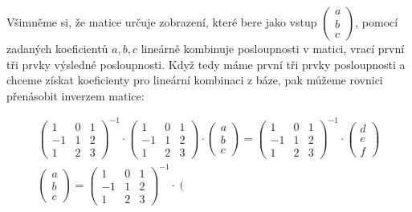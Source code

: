 \documentclass[12pt]{article}
\begin{document}
\begin{enumerate}
\begin{enumerate}
      Všimněme si, že matice určuje zobrazení, které bere jako vstup $\left(\begin{array}{c}
          a \\ b \\ c
        \end{array}\right)$, pomocí zadaných koeficientů $a,b,c$ lineárně kombinuje posloupnosti v matici,
      vrací první tři prvky výsledné posloupnosti. Když tedy máme první tři prvky posloupnosti
      a chceme získat koeficienty pro lineární kombinaci z báze, pak můžeme rovnici přenásobit
      inverzem matice:
      
      \begin{align*}
        \left(\begin{array}{ccc}
          1 & 0 & 1 \\
          -1 & 1 & 2 \\
          1 & 2 & 3
        \end{array}\right)^{-1} \cdot \left(\begin{array}{ccc}
          1 & 0 & 1 \\
          -1 & 1 & 2 \\
          1 & 2 & 3
        \end{array}\right) \cdot \left(\begin{array}{c}
          a \\ b \\ c
        \end{array}\right) = \left(\begin{array}{ccc}
          1 & 0 & 1 \\
          -1 & 1 & 2 \\
          1 & 2 & 3
        \end{array}\right)^{-1} \cdot \left(\begin{array}{c}
          d \\ e \\ f
        \end{array}\right) \\
        \left(\begin{array}{c}
          a \\ b \\ c
        \end{array}\right) = \left(\begin{array}{ccc}
          1 & 0 & 1 \\
          -1 & 1 & 2 \\
          1 & 2 & 3
        \end{array}\right)^{-1} \cdot \left(\begin{array}{c}

\end{array}
\end{align*}
\end{enumerate}
\end{enumerate}
\end{document}
